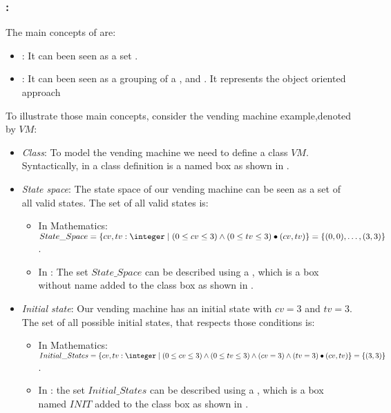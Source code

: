 \subsubsection{:} 
\label{main_concepts_oz} 
The main concepts of \oz{} are:
\begin{itemize}
\item {}: It can been seen as a set \cite{woodcock}.
\item {}: It can been seen as a grouping of a ,  and  \cite{kenji}. It represents the object oriented approach 
\end{itemize}

To illustrate those main concepts, consider the vending machine example,denoted by $VM$:
\begin{itemize}
\item \textit{Class}: To model the vending machine we need to define a class $VM$. Syntactically, in \oz{}
a class definition is a named box as shown in .


\item \textit{State space}: The state space of our vending machine can be seen as a set of all valid states. The set of all valid states is:
\begin{itemize}
\item In Mathematics: $State\_Space=\{cv,tv: \integer\mid (0 \leq  cv \leq 3) \wedge
(0 \leq  tv \leq 3)\bullet(cv,tv)\}  =\{\pair{0}{0},\dots,\pair{3}{3}\}$.
\item In \oz{}: The set $State\_Space$ can be described using a , which is a box without name added to the class box as shown in .
\end{itemize}


\item \textit{Initial state}: Our vending machine has an initial state with $cv = 3$ and $tv = 3$. The set of all possible initial states, that respects those conditions is:  
\begin{itemize}
\item In Mathematics: $Initial\_States =\{cv,tv: \integer\mid (0 \leq  cv \leq 3) \wedge
(0 \leq  tv \leq 3)\wedge (cv = 3) \wedge (tv = 3)\bullet(cv,tv)\}  =\{\pair{3}{3}\}$.
\item In \oz{}: the set $Initial\_States$ can be described using a , which is a box named $INIT$ added to the class box  as shown in .
\end{itemize}



\end{itemize}
